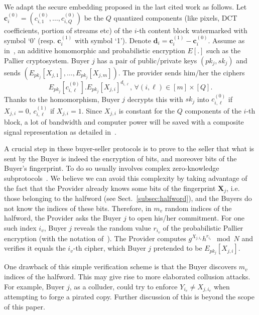 \documentclass{article}
\begin{document}
 We adapt the secure embedding proposed in the last cited work as
 follows. Let $\mathbf{c}_i^{(0)}=(c^{(0)}_{i,1},\ldots,c^{(0)}_{i,Q})$
 be the $Q$ quantized components (like pixels, DCT coefficients, portion of streams etc) of the $i$-th content block watermarked with symbol `0'
 (resp. $\mathbf{c}_i^{(1)}$ with symbol `1'). Denote $\mathbf{d}_i =
 \mathbf{c}_i^{(1)}-\mathbf{c}_i^{(0)}$. Assume as
 in~\cite[Sect. 5]{Deng:2009fk}, an additive homomorphic and
 probabilistic encryption $E[.]$ such as the Pallier cryptosystem. Buyer
 $j$ has a pair of public/private keys $(pk_{j},sk_j)$ and sends
 $(E_{pk_{j}}[X_{j,1}],\ldots,E_{pk_{j}}[X_{j,m}])$. The provider sends
 him/her the ciphers
 $$
 E_{pk_{j}}[c^{(0)}_{i,\ell}].E_{pk_{j}}[X_{j,i}]^{d_{i,\ell}},\,\forall
 (i,\ell)\in[m]\times[Q].
 $$
 Thanks to the homomorphism, Buyer $j$ decrypts this with $sk_j$ into
 $c^{(0)}_{i,\ell}$ if $X_{j,i}=0$, $c^{(1)}_{i,\ell}$ if $X_{j,i}=1$.
 Since $X_{j,i}$ is constant for the $Q$ components of the $i$-th
 block, a lot of bandwidth and computer power will be saved with a
 composite signal representation as detailed
 in~\cite[Sect. 3.2.2]{Deng:2009fk}.




A crucial step in these buyer-seller protocols is to prove to the
seller that what is sent by the Buyer is indeed the encryption of bits,
and moreover bits of the Buyer's fingerprint.  To do so usually
involves complex zero-knowledge subprotocols~\cite{Kuri08Spread,Deng:2009fk}.
We believe we can avoid
this complexity by taking advantage of the fact that
the Provider already knows some bits of the fingerprint
$\mathbf{X}_{j}$, i.e. those
belonging to the halfword (see
Sect.~\ref{subsec:halfword}), and the Buyers do not know the indices of these bits. Therefore, in $m_v$ random indices of
the halfword, the Provider asks the Buyer $j$ to open his/her
commitment. For one such index $i_{v}$, Buyer $j$ reveals the random
value $r_{i_v}$ of the probabilistic Pallier encryption (with the notation of~\cite{Deng:2009fk}). The Provider
computes $g^{X_{j,i_v}}h^{r_{i_v}}\mod N$ and verifies it equals the
$i_v$-th cipher, which Buyer $j$ pretended to be
$E_{pk_{j}}[X_{j,i}]$. 

One drawback of this simple verification scheme
is that the Buyer discovers $m_v$ indices of the halfword. This may
give rise to more elaborated collusion attacks.  For example, Buyer $j$, as a
colluder, could try to
enforce $Y_{i_v} \neq X_{j,i_v}$ when attempting to forge a pirated
copy.  Further discussion of this is beyond the scope of this paper.
\end{document}
